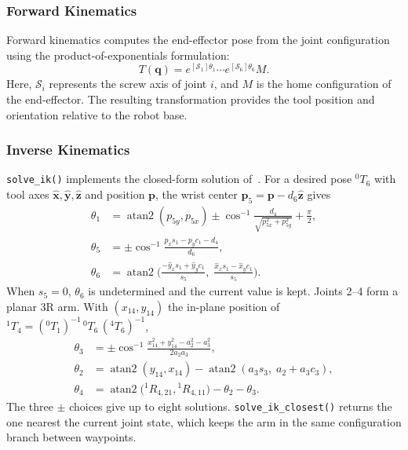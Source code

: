 \documentclass[conference]{IEEEtran}
\begin{document}
\subsubsection{Forward Kinematics}
Forward kinematics computes the end-effector
pose from the joint configuration using the
product-of-exponentials formulation:
\begin{equation}
    T(\mathbf{q}) =
    e^{[\mathcal{S}_1]\theta_1}
    \cdots
    e^{[\mathcal{S}_6]\theta_6}M.
\end{equation}
Here, $\mathcal{S}_i$ represents the screw
axis of joint $i$, and $M$ is the home
configuration of the end-effector.
The resulting transformation provides the
tool position and orientation relative to
the robot base.

\subsubsection{Inverse Kinematics}
\texttt{solve\_ik()} implements the closed-form solution of~\cite{kebria2016}. For a 
desired pose ${}^{0}T_6$ with tool axes $\hat{\mathbf x},\hat{\mathbf y},\hat{\mathbf z}$ and 
position $\mathbf p$, the wrist center $\mathbf p_5=\mathbf p-d_6\hat{\mathbf z}$ gives
\begin{align}
    \theta_1 &= \operatorname{atan2}(p_{5y},p_{5x})
      \pm\cos^{-1}\!\frac{d_4}{\sqrt{p_{5x}^2+p_{5y}^2}}+\frac{\pi}{2},\\
    \theta_5 &= \pm\cos^{-1}\!\frac{p_x s_1-p_y c_1-d_4}{d_6},\\
    \theta_6 &= \operatorname{atan2}\!\Big(
        \frac{-\hat y_x s_1+\hat y_y c_1}{s_5},\;
        \frac{\hat x_x s_1-\hat x_y c_1}{s_5}\Big).
    \label{eq:ik6}
\end{align}
When $s_5=0$, $\theta_6$ is undetermined and the current value is kept. Joints 2--4 form a planar 
3R arm. With $(x_{14},y_{14})$ the in-plane position of ${}^{1}T_4=({}^{0}T_1)^{-1}\,{}^{0}T_6\,({}^{4}T_6)^{-1}$,
\begin{align}
    \theta_3 &= \pm\cos^{-1}\!\frac{x_{14}^2+y_{14}^2-a_2^2-a_3^2}
        {2a_2a_3},\\
    \theta_2 &= \operatorname{atan2}(y_{14},x_{14})
        -\operatorname{atan2}(a_3s_3,\;a_2+a_3c_3),\\
    \theta_4 &= \operatorname{atan2}\!\big({}^{1}R_{4,21},
        {}^{1}R_{4,11}\big)-\theta_2-\theta_3 .
\end{align}
The three $\pm$ choices give up to eight solutions. \texttt{solve\_ik\_closest()} 
returns the one nearest the current joint state, which keeps the arm in the same configuration branch 
between waypoints.
\end{document}
